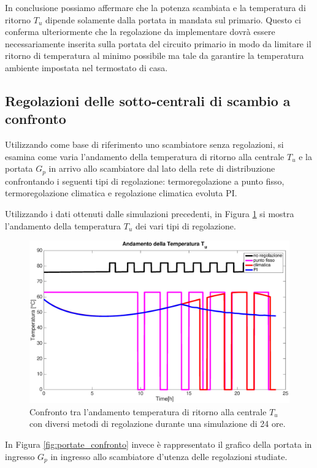\documentclass[laurea,oneside,11pt]{USiena_tesiLM}
\begin{document}
In conclusione possiamo affermare che la potenza scambiata e la temperatura di ritorno $T_u$ dipende solamente dalla portata in mandata sul primario.
Questo ci conferma ulteriormente che la regolazione da implementare dovrà essere necessariamente inserita sulla portata del circuito primario in modo da limitare il ritorno di temperatura al minimo possibile ma tale da garantire la temperatura ambiente impostata nel termostato di casa.

\subsection{Regolazioni delle sotto-centrali di scambio a confronto}
Utilizzando come base di riferimento uno scambiatore senza regolazioni, si esamina come varia l'andamento della temperatura di ritorno alla centrale $T_u$ e la portata $G_p$ in arrivo allo scambiatore dal lato della rete di distribuzione  confrontando i seguenti tipi di regolazione: termoregolazione a punto fisso, termoregolazione climatica e regolazione climatica evoluta PI.

Utilizzando i dati ottenuti dalle simulazioni precedenti, in Figura \ref{fig:To_confronto}  si mostra l'andamento della  temperatura $T_u$ dei vari tipi di regolazione.

\begin{figure}[!ht]
\centering
\includegraphics[width=\textwidth]{figure/To_confronto} 
\caption{Confronto tra l'andamento temperatura di ritorno alla centrale $T_u$ con diversi metodi di regolazione durante una simulazione di 24 ore.}
\label{fig:To_confronto}
\end{figure}

In Figura \ref{fig:portate_confronto} invece è rappresentato il grafico della portata in ingresso $G_p$ in ingresso allo scambiatore d'utenza delle regolazioni studiate. 
\end{document}
